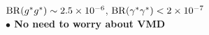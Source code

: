 \documentclass[aspectratio=169]{beamer}
\begin{document}
\begin{frame}
\begin{columns}
\begin{column}{0.5\textwidth}
			{\small  ${\rm BR}(g^*g^*)\sim 2.5\times 10^{-6}$}, {\small ${\rm BR}(\gamma^*\gamma^*)< 2\times 10^{-7}$}\\
			\textcolor{PittRoyal}{\bf $\bullet$ No need to worry about VMD}
		\end{column}
	\end{columns}
\end{frame}
\end{document}
